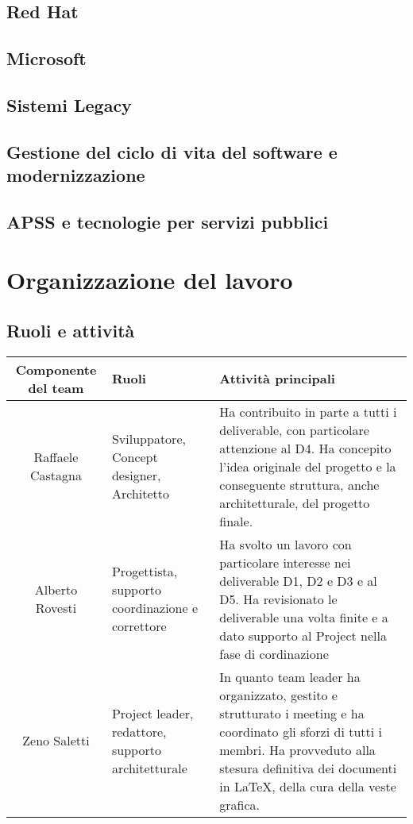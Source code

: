 \documentclass[11pt, a4paper]{article}
\theoremstyle{definition}
\begin{document}
\subsection{Red Hat}
\subsection{Microsoft}
\subsection{Sistemi Legacy}
\subsection{Gestione del ciclo di vita del software e modernizzazione}
\subsection{APSS e tecnologie per servizi pubblici}

\newpage
\section{Organizzazione del lavoro}
\subsection{Ruoli e attività}
\begin{center}
  \footnotesize
  \begin{tabularx}{\textwidth}{|c||X||X|}
      \hline
      \cellcolor{red!70}Componente del team & \cellcolor{red!70}Ruoli & \cellcolor{red!70}Attività principali\\
      \hline
      Raffaele Castagna & Sviluppatore, Concept designer, Architetto & Ha contribuito in parte a tutti i deliverable, con particolare attenzione al D4. Ha concepito l'idea originale del progetto e la conseguente struttura, anche architetturale, del progetto finale.\\
      \hline
      Alberto Rovesti & Progettista, supporto coordinazione e correttore & Ha svolto un lavoro con particolare interesse nei deliverable D1, D2 e D3 e al D5. Ha revisionato le deliverable una volta finite e a dato supporto al Project nella fase di cordinazione\\
      \hline
      Zeno Saletti & Project leader, redattore, supporto architetturale & In quanto team leader ha organizzato, gestito e strutturato i meeting e ha coordinato gli sforzi di tutti i membri. Ha provveduto alla stesura definitiva dei documenti in \LaTeX, della cura della veste grafica.\\
      \hline
  \end{tabularx}
\end{center}
\end{document}
